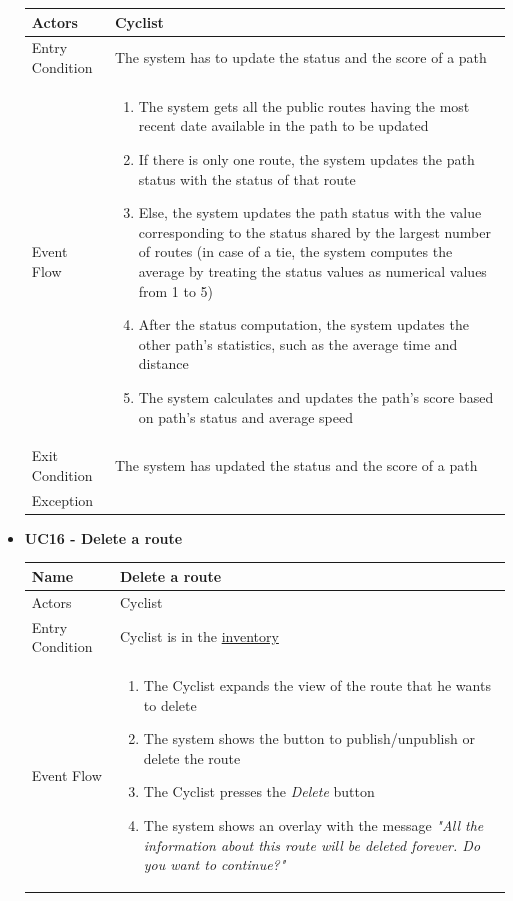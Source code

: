 \begin{itemize}
\begin{tabular}{|p{7cm}|p{7cm}|}
Actors          & Cyclist \\ \hline
Entry Condition & The system has to update the status and the score of a path \\ \hline
Event Flow      & \begin{enumerate}
    \item The system gets all the public routes having the most recent date available in the path to be updated 
    \item If there is only one route, the system updates the path status with the status of that route
    \item Else, the system updates the path status with the value corresponding to the status shared by the largest number of routes (in case of a tie, the system computes the average by treating the status values as numerical values from 1 to 5)
    \item After the status computation, the system updates the other path's statistics, such as the average time and distance
    \item The system calculates and updates the path's score based on path's status and average speed
\end{enumerate}
\\ \hline
Exit Condition  & The system has updated the status and the score of a path\\ \hline
Exception       &
\\ \hline
\end{tabular}
\newpage
\item \textbf{UC16 - Delete a route}\par\smallskip
\noindent
\begin{tabular}{|p{7cm}|p{7cm}|}
\hline
Name            & Delete a route \\ \hline
Actors          & Cyclist \\ \hline
Entry Condition &  Cyclist is in the \hyperref[fig:Inventory]{inventory}\\ \hline
Event Flow      &
\begin{enumerate}[label=\arabic*.]
    \item The Cyclist expands the view of the route that he wants to delete  
    \item The system shows the button to publish/unpublish or delete the route 
    \item The Cyclist presses the \textit{Delete} button
    \item The system shows an overlay with the message \textit{"All the information about this route will be deleted forever. Do you want to continue?"} 

\end{enumerate}
\end{tabular}
\end{itemize}
